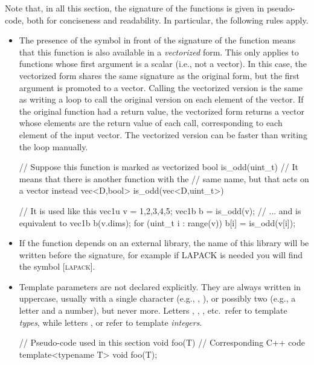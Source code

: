 \documentclass[12pt]{report}
\newcommand*\circled[1]{\tikz[baseline=(char.base)]{
            \node[shape=circle,draw,inner sep=0.0pt] (char) {#1};}}
\newcommand{\vectorfuncsym}{\circled{$\hspace{-1pt}\mathcal{V}$}\xspace}
\newcommand{\lapacksym}{\textsc{\small[lapack\small]}}
\newenvironment{example}
{
    \begin{mdframed}[style=example,frametitle={Example}]
}
{
    \end{mdframed}
}
\begin{document}
Note that, in all this section, the signature of the functions is given in pseudo-code, both for conciseness and readability. In particular, the following rules apply.

\begin{itemize}
\item The presence of the \vectorfuncsym symbol in front of the signature of the function means that this function is also available in a \emph{vectorized} form. This only applies to functions whose first argument is a scalar (i.e., not a vector). In this case, the vectorized form shares the same signature as the original form, but the first argument is promoted to a vector. Calling the vectorized version is the same as writing a loop to call the original version on each element of the vector. If the original function had a return value, the vectorized form returns a vector whose elements are the return value of each call, corresponding to each element of the input vector. The vectorized version can be faster than writing the loop manually.

\begin{example}
\begin{cppcode}
// Suppose this function is marked as vectorized
bool is_odd(uint_t)
// It means that there is another function with the
// same name, but that acts on a vector instead
vec<D,bool> is_odd(vec<D,uint_t>)

// It is used like this
vec1u v = {1,2,3,4,5};
vec1b b = is_odd(v);
// ... and is equivalent to
vec1b b(v.dims);
for (uint_t i : range(v)) {
    b[i] = is_odd(v[i]);
}
\end{cppcode}
\end{example}

\item If the function depends on an external library, the name of this library will be written before the signature, for example if LAPACK is needed you will find the symbol \lapacksym.

\item Template parameters are not declared explicitly. They are always written in uppercase, usually with a single character (e.g., , ), or possibly two (e.g., a letter and a number), but never more. Letters , , , etc.~refer to template \emph{types}, while letters ,  or  refer to template \emph{integers}.

\begin{example}
\begin{cppcode}
// Pseudo-code used in this section
void foo(T)
// Corresponding C++ code
template<typename T>
void foo(T);


\end{cppcode}
\end{example}
\end{itemize}
\end{document}
